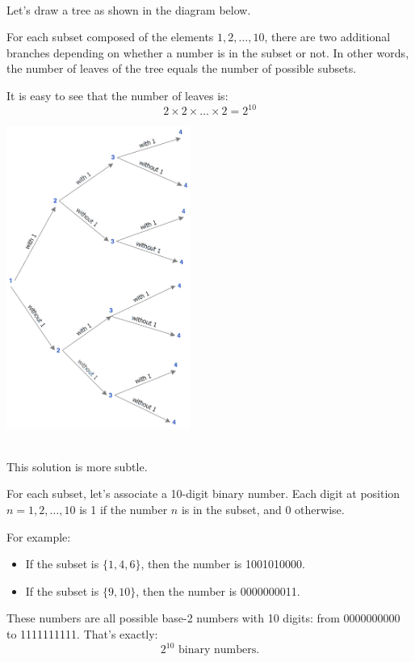 \documentclass{article}
\begin{document}
\begin{soln}[Solution 1]\ \\\indent
    Let’s draw a tree as shown in the diagram below.

    For each subset composed of the elements \( 1, 2, \dots, 10 \), there are two additional branches depending on whether a number is in the subset or not. In other words, the number of leaves of the tree equals the number of possible subsets.

    It is easy to see that the number of leaves is:
    \[
        2 \times 2 \times \dots \times 2 = 2^{10}
    \]

    \begin{center}
        \includegraphics[width=6cm]{./png/subsets.png}
    \end{center}
\end{soln}

\begin{soln}[Solution 2]\ \\\indent
    This solution is more subtle.

    For each subset, let’s associate a 10-digit binary number. Each digit at position \( n = 1, 2, \dots, 10 \) is 1 if the number \( n \) is in the subset, and 0 otherwise.

    For example:
    \begin{itemize}[topsep=0pt, itemsep=2pt]
        \item If the subset is \( \{1, 4, 6\} \), then the number is 1001010000.
        \item If the subset is \( \{9, 10\} \), then the number is 0000000011.
    \end{itemize}

    These numbers are all possible base-2 numbers with 10 digits: from 0000000000 to 1111111111. That's exactly:
    \[
        2^{10} \text{ binary numbers}.
    \]
\end{soln}
\end{document}
